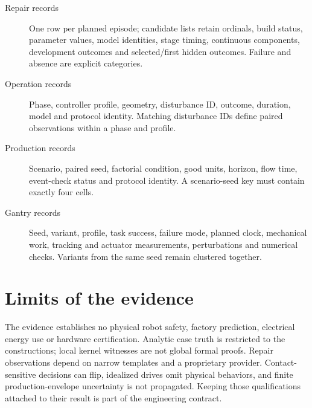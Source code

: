\begin{description}
\item[Repair records] One row per planned episode; candidate lists retain ordinals, build status, parameter values, model identities, stage timing, continuous components, development outcomes and selected/first hidden outcomes. Failure and absence are explicit categories.
\item[Operation records] Phase, controller profile, geometry, disturbance ID, outcome, duration, model and protocol identity. Matching disturbance IDs define paired observations within a phase and profile.
\item[Production records] Scenario, paired seed, factorial condition, good units, horizon, flow time, event-check status and protocol identity. A scenario-seed key must contain exactly four cells.
\item[Gantry records] Seed, variant, profile, task success, failure mode, planned clock, mechanical work, tracking and actuator measurements, perturbations and numerical checks. Variants from the same seed remain clustered together.
\end{description}



\section{Limits of the evidence}
The evidence establishes no physical robot safety, factory prediction, electrical energy use or hardware certification. Analytic case truth is restricted to the constructions; local kernel witnesses are not global formal proofs. Repair observations depend on narrow templates and a proprietary provider. Contact-sensitive decisions can flip, idealized drives omit physical behaviors, and finite production-envelope uncertainty is not propagated. Keeping those qualifications attached to their result is part of the engineering contract.



